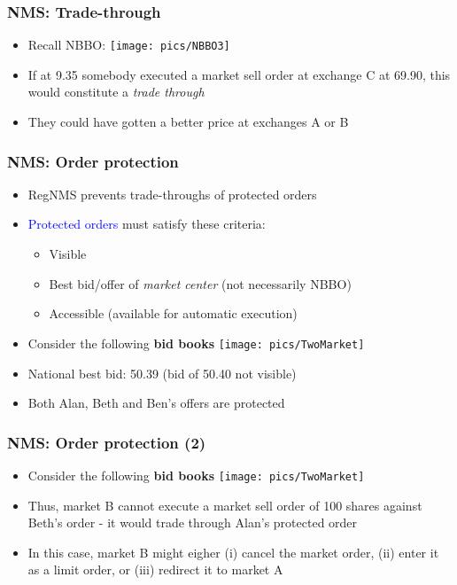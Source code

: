 \documentclass[english,10pt
,aspectratio=169
]{beamer}
\begin{document}
\begin{frame}
\frametitle{NMS: Trade-through}
\begin{itemize}	
\item Recall NBBO:
\texttt{[image: pics/NBBO3]}
\item If at 9.35 somebody executed a market sell order at exchange C at 69.90, this would constitute a \textit{trade through}
\pause
\item They could have gotten a better price at exchanges A or B
\end{itemize}
\end{frame}


\begin{frame}
\frametitle{NMS: Order protection}
\begin{itemize}	
\item RegNMS prevents trade-throughs of protected orders
\item \textcolor{blue}{Protected orders} must satisfy these criteria:
\begin{itemize}
\item Visible 
\item Best bid/offer of \textit{market center} (not necessarily NBBO)
\item Accessible (available for automatic execution)
\end{itemize}
\item Consider the following \textbf{bid books} 
\texttt{[image: pics/TwoMarket]}
\item National best bid: 50.39 (bid of 50.40 not visible)
\item Both Alan, Beth and Ben's offers are protected
\end{itemize}
\end{frame}


\begin{frame}
\frametitle{NMS: Order protection (2)}
\begin{itemize}	
\item Consider the following \textbf{bid books} 
\texttt{[image: pics/TwoMarket]}
\item Thus, market B cannot execute a market sell order of 100 shares against Beth's order - it would trade through Alan's protected order
\item In this case, market B might eigher (i) cancel the market order, (ii) enter it as a limit order, or (iii) redirect it to market A
\end{itemize}
\end{frame}
\end{document}
